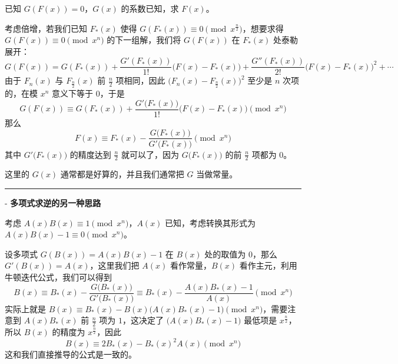 已知 $G(F(x)) = 0$，$G(x)$ 的系数已知，求 $F(x)$。

考虑倍增，若我们已知 $F_*(x)$ 使得 $G(F_*(x)) \equiv 0 \pmod{x^{\frac{n}{2}}}$，想要求得 $G(F(x)) \equiv 0 \pmod{x^n}$ 的下一组解，我们将 $G(F(x))$ 在 $F_*(x)$ 处泰勒展开：
\[
G(F(x)) = G(F_*(x)) + \frac{G'(F_*(x))}{1!}\bigl(F(x) - F_*(x)\bigr) + \frac{G''(F_*(x))}{2!}\bigl(F(x) - F_*(x)\bigr)^2 + \cdots
\]
由于 $F_n(x)$ 与 $F_{\frac{n}{2}}(x)$ 前 $\frac{n}{2}$ 项相同，因此 $\bigl(F_n(x) - F_{\frac{n}{2}}(x)\bigr)^2$ 至少是 $n$ 次项的，在模 $x^n$ 意义下等于 $0$，于是
\[
G(F(x)) \equiv G(F_*(x)) + \frac{G'\bigl(F_*(x)\bigr)}{1!}\bigl(F(x) - F_*(x)\bigr) \pmod{x^n}
\]
那么
\[
F(x) \equiv F_*(x) - \frac{G\bigl(F_*(x)\bigr)}{G'\bigl(F_*(x)\bigr)} \pmod{x^n}
\]
其中 $G'\bigl(F_*(x)\bigr)$ 的精度达到 $\frac{n}{2}$ 就可以了，因为 $G\bigl(F_*(x)\bigr)$ 的前 $\frac{n}{2}$ 项都为 $0$。

这里的 $G(x)$ 通常都是好算的，并且我们通常把 $G$ 当做常量。

\vspace{2ex}
\noindent\rule{\linewidth}{0.4pt}
\vspace{2ex}

- \textbf{多项式求逆的另一种思路}

考虑 $A(x)B(x) \equiv 1 \pmod{x^n}$，$A(x)$ 已知，考虑转换其形式为 $A(x)B(x) - 1 \equiv 0 \pmod{x^n}$。

设多项式 $G(B(x)) = A(x)B(x) - 1$ 在 $B(x)$ 处的取值为 $0$，那么 $G'(B(x)) = A(x)$，这里我们把 $A(x)$ 看作常量，$B(x)$ 看作主元，利用牛顿迭代公式，我们可以得到
\[
B(x) \equiv B_*(x) - \frac{G\bigl(B_*(x)\bigr)}{G'\bigl(B_*(x)\bigr)} \equiv B_*(x) - \frac{A(x)B_*(x) - 1}{A(x)} \pmod{x^n}
\]
实际上就是 $B(x) \equiv B_*(x) - B(x)\bigl(A(x)B_*(x) - 1\bigr) \pmod{x^n}$，需要注意到 $A(x)B_*(x)$ 前 $\frac{n}{2}$ 项为 $1$，这决定了 $\bigl(A(x)B_*(x) - 1\bigr)$ 最低项是 $x^{\frac{n}{2}}$，所以 $B(x)$ 的精度为 $x^{\frac{n}{2}}$，因此
\[
B(x) \equiv 2B_*(x) - B_*(x)^2A(x) \pmod{x^n}
\]
这和我们直接推导的公式是一致的。